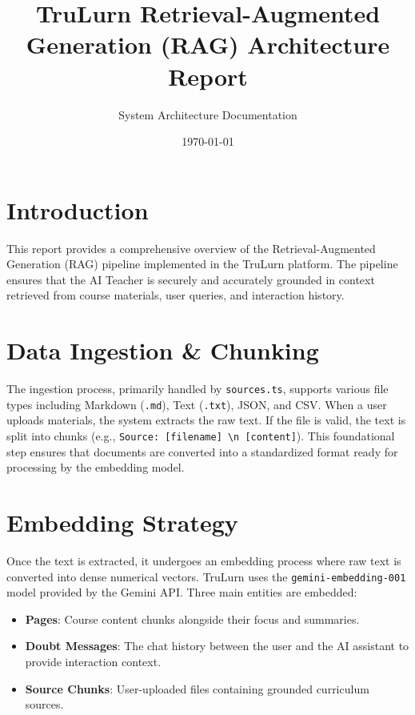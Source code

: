 \documentclass[11pt,a4paper]{article}
\title{\textbf{TruLurn Retrieval-Augmented Generation (RAG) Architecture Report}}
\author{System Architecture Documentation}
\date{\today}
\begin{document}
\maketitle

\section{Introduction}
This report provides a comprehensive overview of the Retrieval-Augmented Generation (RAG) pipeline implemented in the TruLurn platform. The pipeline ensures that the AI Teacher is securely and accurately grounded in context retrieved from course materials, user queries, and interaction history.

\section{Data Ingestion \& Chunking}
The ingestion process, primarily handled by \texttt{sources.ts}, supports various file types including Markdown (\texttt{.md}), Text (\texttt{.txt}), JSON, and CSV. 
When a user uploads materials, the system extracts the raw text. If the file is valid, the text is split into chunks (e.g., \texttt{Source: [filename] \textbackslash n [content]}). This foundational step ensures that documents are converted into a standardized format ready for processing by the embedding model.

\section{Embedding Strategy}
Once the text is extracted, it undergoes an embedding process where raw text is converted into dense numerical vectors. TruLurn uses the \texttt{gemini-embedding-001} model provided by the Gemini API.
Three main entities are embedded:
\begin{itemize}
    \item \textbf{Pages}: Course content chunks alongside their focus and summaries.
    \item \textbf{Doubt Messages}: The chat history between the user and the AI assistant to provide interaction context.
    \item \textbf{Source Chunks}: User-uploaded files containing grounded curriculum sources.
\end{itemize}
\end{document}
